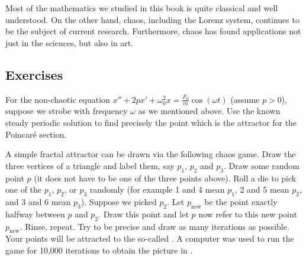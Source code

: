 Most of the mathematics we studied in this book is quite classical and
well understood.
On the other hand, chaos, including the Lorenz system, continues to be the
subject of current research.
Furthermore, chaos has found applications not just in the sciences, but
also in art.

\begin{myfig}
\capstart
{}
\caption{Graph of the $x(t)$ component of the solution.
\label{nlin:lorenz-graphx}}
\end{myfig}

\subsection{Exercises}

\begin{exercise}
For the non-chaotic equation
$x''+2p x' + \omega_0^2 x = \frac{F_0}{m} \cos (\omega t)$ (assume $p > 0$), suppose we
strobe with frequency $\omega$ as we mentioned above.  Use the known
steady periodic solution to find precisely the point which is the attractor
for the Poincar\'e section.
\end{exercise}

\begin{samepage}
\begin{exercise}[project]
A simple fractal attractor can be drawn via the following chaos game.  Draw
the three
vertices of a triangle and label them, say $p_1$, $p_2$
and $p_3$.  Draw some
random point $p$ (it does not have to be one of the three points above).
Roll a die to pick one of the $p_1$, $p_2$, or $p_3$
randomly (for example 1 and 4 mean $p_1$, 2 and 5 mean $p_2$, and 3 and 6
mean $p_3$).  Suppose we picked $p_2$.  Let $p_{\text{new}}$ be the
point exactly halfway between $p$ and $p_2$.  Draw this point and let $p$
now refer to this new point $p_{\text{new}}$.  Rinse, repeat.  Try to be
precise and draw as many iterations as possible.  Your points will be
attracted to the so-called \emph{}.  A computer
was used to run the game for 10,000 iterations to obtain the picture in
.
\end{exercise}
\end{samepage}

